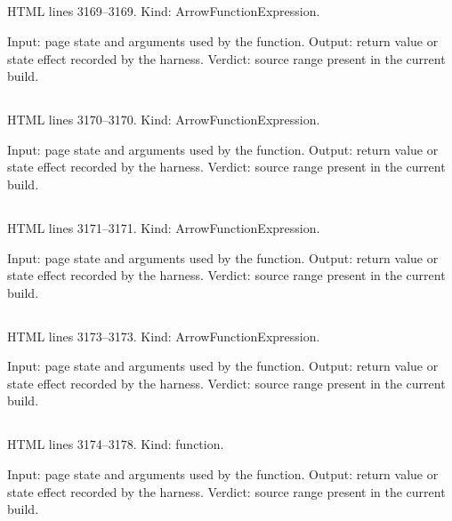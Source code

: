 \subsection*{\texttt{}}
\label{vf_90_hex}
HTML lines 3169--3169. Kind: ArrowFunctionExpression.

Input: page state and arguments used by the function.
Output: return value or state effect recorded by the harness.
Verdict: source range present in the current build.

\subsection*{\texttt{}}
\label{vf_91_mean}
HTML lines 3170--3170. Kind: ArrowFunctionExpression.

Input: page state and arguments used by the function.
Output: return value or state effect recorded by the harness.
Verdict: source range present in the current build.

\subsection*{\texttt{}}
\label{vf_92_sd}
HTML lines 3171--3171. Kind: ArrowFunctionExpression.

Input: page state and arguments used by the function.
Output: return value or state effect recorded by the harness.
Verdict: source range present in the current build.

\subsection*{\texttt{}}
\label{vf_93_wellPos}
HTML lines 3173--3173. Kind: ArrowFunctionExpression.

Input: page state and arguments used by the function.
Output: return value or state effect recorded by the harness.
Verdict: source range present in the current build.

\subsection*{\texttt{}}
\label{vf_94_download}
HTML lines 3174--3178. Kind: function.

Input: page state and arguments used by the function.
Output: return value or state effect recorded by the harness.
Verdict: source range present in the current build.

